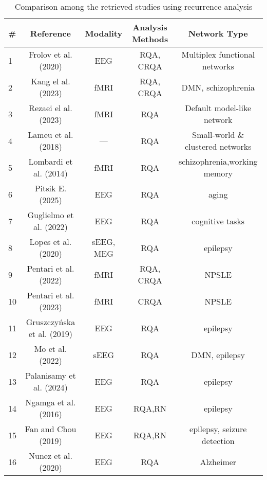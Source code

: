 \documentclass{article}
\begin{document}
		\begin{table}[h]
		\centering
		\caption{Comparison among the retrieved studies using recurrence analysis}
		\label{tab:comparison}
		\begin{tabular}{@{}lcccc@{}}
		\toprule
		\# & Reference & Modality & Analysis Methods & Network Type \\
		\midrule

		1  & Frolov et al. (2020) & EEG & RQA, CRQA & Multiplex functional networks \\
		2  & Kang el al. (2023) & fMRI & RQA, CRQA & DMN, schizophrenia \\
		3  & Rezaei el al. (2023) & fMRI & RQA & Default model-like network \\
		4  & Lameu et al. (2018) & --- & RQA & Small-world \& clustered networks \\
		5  & Lombardi et al. (2014) & fMRI & RQA & schizophrenia,working memory \\
		6  & Pitsik E. (2025) & EEG & RQA & aging \\
		7  & Guglielmo et al. (2022) & EEG & RQA & cognitive tasks \\
		8  & Lopes et al. (2020) & sEEG, MEG & RQA & epilepsy \\
		9  & Pentari et al. (2022) & fMRI & RQA, CRQA & NPSLE \\
		10 & Pentari et al. (2023) & fMRI & CRQA & NPSLE  \\
		11 & Gruszczyńska et al. (2019) & EEG & RQA & epilepsy \\
		12 & Mo et al. (2022) & sEEG & RQA & DMN, epilepsy \\
		13 & Palanisamy et al. (2024) & EEG & RQA & epilepsy \\
		14 & Ngamga et al. (2016) & EEG & RQA,RN & epilepsy \\
		15 & Fan and Chou (2019) & EEG & RQA,RN & epilepsy, seizure detection \\
		16 & Nunez et al. (2020) & EEG & RQA & Alzheimer \\

		\bottomrule
		\end{tabular}
		\end{table}




	\newpage





\end{document}
